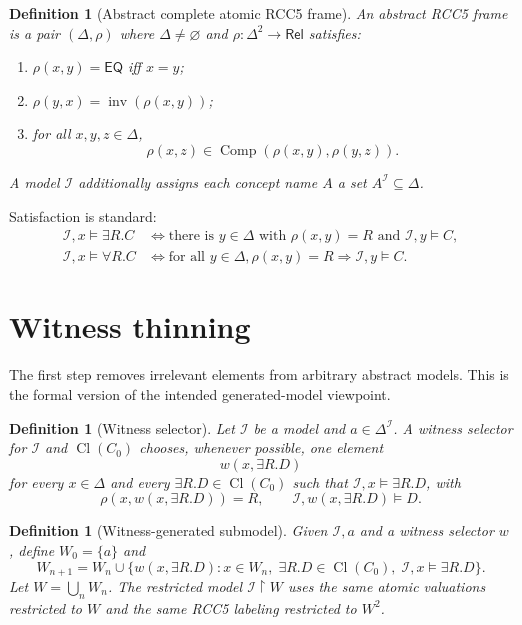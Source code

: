 \documentclass[11pt]{article}
\newtheorem{definition}[theorem]{Definition}
\newcommand{\Rel}{\mathsf{Rel}}
\newcommand{\EQ}{\mathsf{EQ}}
\newcommand{\Cl}{\operatorname{Cl}}
\newcommand{\Comp}{\operatorname{Comp}}
\newcommand{\Inv}{\operatorname{inv}}
\begin{document}
\begin{definition}[Abstract complete atomic RCC5 frame]
An abstract RCC5 frame is a pair $(\Delta,\rho)$ where $\Delta\ne\varnothing$ and $\rho:\Delta^2\to\Rel$ satisfies:
\begin{enumerate}[label=(R\arabic*)]
\item $\rho(x,y)=\EQ$ iff $x=y$;
\item $\rho(y,x)=\Inv(\rho(x,y))$;
\item for all $x,y,z\in\Delta$,
\[
  \rho(x,z)\in\Comp(\rho(x,y),\rho(y,z)).
\]
\end{enumerate}
A model $\mathcal I$ additionally assigns each concept name $A$ a set $A^{\mathcal I}\subseteq\Delta$.
\end{definition}

Satisfaction is standard:
\begin{align*}
\mathcal I,x\models \exists R.C &\iff
  \text{there is }y\in\Delta\text{ with }\rho(x,y)=R\text{ and }\mathcal I,y\models C,\\
\mathcal I,x\models \forall R.C &\iff
  \text{for all }y\in\Delta,\rho(x,y)=R\Rightarrow \mathcal I,y\models C.
\end{align*}

\section{Witness thinning}

The first step removes irrelevant elements from arbitrary abstract models.  This is the formal version of the intended generated-model viewpoint.

\begin{definition}[Witness selector]
Let $\mathcal I$ be a model and $a\in\Delta^{\mathcal I}$.  A witness selector for $\mathcal I$ and $\Cl(C_0)$ chooses, whenever possible, one element
\[
  w(x,\exists R.D)
\]
for every $x\in\Delta$ and every $\exists R.D\in\Cl(C_0)$ such that $\mathcal I,x\models\exists R.D$, with
\[
  \rho(x,w(x,\exists R.D))=R,
  \qquad
  \mathcal I,w(x,\exists R.D)\models D.
\]
\end{definition}

\begin{definition}[Witness-generated submodel]
Given $\mathcal I,a$ and a witness selector $w$, define $W_0=\{a\}$ and
\[
  W_{n+1}=W_n\cup
  \{w(x,\exists R.D):x\in W_n,\;\exists R.D\in\Cl(C_0),\;\mathcal I,x\models\exists R.D\}.
\]
Let $W=\bigcup_n W_n$.  The restricted model $\mathcal I\upharpoonright W$ uses the same atomic valuations restricted to $W$ and the same RCC5 labeling restricted to $W^2$.
\end{definition}
\end{document}
